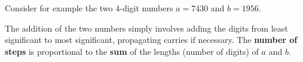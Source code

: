 \documentclass{article}
\begin{document}
%
%
%
%
%

Consider for example the two 4-digit numbers \(a = 7430\) and \(b = 1956\).

The addition of the two numbers simply involves adding the digits from least significant to most significant, propagating carries if necessary. The {\bf number of steps} is proportional to the {\bf sum} of the lengths (number of digits) of \(a\) and \(b\).
\end{document}
